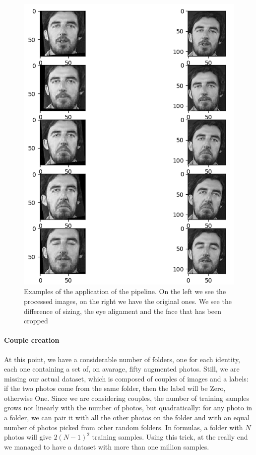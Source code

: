 \begin{figure}[t]
\includegraphics[width=1\linewidth]{images/processed.png}
   \caption{Examples of the application of the pipeline. On the left we see the processed images, on the right we have the original ones. We see the difference of sizing, the eye alignment and the face that has been cropped}
\label{fig:long}
\label{fig:onecol}
\end{figure}

\paragraph{Couple creation}
At this point, we have a considerable number of folders, one for each identity, each one containing a set of, on avarage, fifty augmented photos. Still, we are missing our actual dataset, which is composed of couples of images and a labels: if the two photos come from the same folder, then the label will be Zero, otherwise One. Since we are considering couples, the number of training samples grows not linearly with the number of photos, but quadratically: for any photo in a folder, we can pair it with all the other photos on the folder and with an equal number of photos picked from other random folders. In formulas, a folder with $N$ photos will give $2(N-1)^2$ training samples.
Using this trick, at the really end we managed to have a dataset with more than one million samples.

